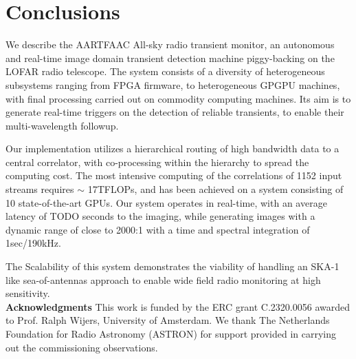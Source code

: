 \documentclass{ws-jai}
\begin{document}

\section {\label{sec:conclusion} Conclusions}
We  describe the  AARTFAAC All-sky  radio transient  monitor, an  autonomous and
real-time image  domain transient detection  machine piggy-backing on  the LOFAR
radio telescope. The  system consists of a diversity  of heterogeneous subsystems
ranging  from  FPGA  firmware,  to   heterogeneous  GPGPU  machines,  with  final
processing carried out on commodity computing  machines.  Its aim is to generate
real-time  triggers on  the detection  of reliable  transients, to  enable their
multi-wavelength followup.

Our implementation utilizes  a hierarchical routing of high bandwidth  data to a
central  correlator,  with co-processing  within  the  hierarchy to  spread  the
computing cost.  The most intensive computing  of the correlations of  1152 input
streams requires $\sim$ 17TFLOPs, and has  been achieved on a system consisting of
10  state-of-the-art GPUs.  Our system  operates in  real-time, with  an average
latency of TODO  seconds to the imaging, while generating  images with a dynamic
range of close to 2000:1 with a time and spectral integration of 1sec/190kHz.

The Scalability of  this system demonstrates the viability of  handling an SKA-1
like  sea-of-antennas approach  to enable  wide field  radio monitoring  at high
sensitivity.\\

\noindent \textbf{Acknowledgments}
This work is funded by the ERC grant C.2320.0056 awarded to Prof.  Ralph Wijers,
University  of Amsterdam. We  thank The  Netherlands  Foundation for  Radio
Astronomy  (ASTRON)  for support  provided  in  carrying out  the  commissioning
observations.



\end{document}
